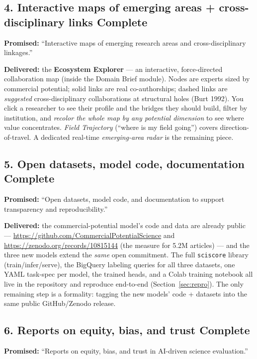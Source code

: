 \documentclass[11pt]{article}
\newcommand{\stDone}{\textbf{\textcolor{good}{Complete}}}
\begin{document}
\subsection{4. Interactive maps of emerging areas + cross-disciplinary links \hfill \stDone}
\textbf{Promised:} ``Interactive maps of emerging research areas and
cross-disciplinary linkages.''

\textbf{Delivered:} the \textbf{Ecosystem Explorer} --- an interactive,
force-directed collaboration map (inside the Domain Brief module). Nodes are
experts sized by commercial potential; solid links are real co-authorships; dashed
links are \emph{suggested} cross-disciplinary collaborations at structural holes
(Burt 1992). You click a researcher to see their profile and the bridges they
should build, filter by institution, and \emph{recolor the whole map by any
potential dimension} to see where value concentrates. \emph{Field Trajectory}
(``where is my field going'') covers direction-of-travel. A dedicated real-time
\emph{emerging-area radar} is the remaining piece.

\subsection{5. Open datasets, model code, documentation \hfill \stDone}
\textbf{Promised:} ``Open datasets, model code, and documentation to support
transparency and reproducibility.''

\textbf{Delivered:} the commercial-potential model's code and data are already
public --- \url{https://github.com/CommercialPotentialScience} and
\url{https://zenodo.org/records/10815144} (the measure for 5.2M articles) --- and
the three new models extend the \emph{same} open commitment. The full
\texttt{sciscore} library (train/infer/serve), the BigQuery labeling queries for all
three datasets, one YAML task-spec per model, the trained heads, and a Colab
training notebook all live in the repository and reproduce end-to-end
(Section~\ref{sec:repro}). The only remaining step is a formality: tagging the new
models' code + datasets into the same public GitHub/Zenodo release.

\subsection{6. Reports on equity, bias, and trust \hfill \stDone}
\textbf{Promised:} ``Reports on equity, bias, and trust in AI-driven science
evaluation.''
\end{document}
